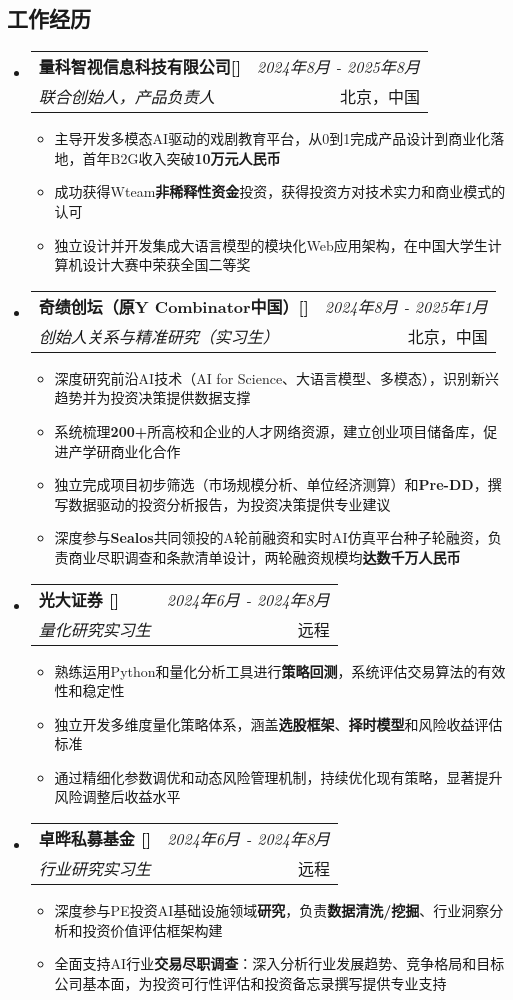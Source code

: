 \documentclass[a4paper,11pt]{article}
\makeatletter
\newcommand{\resumeSubheading}[4]{
\vspace{0.5mm}\item
    \begin{tabular*}{0.98\textwidth}[t]{l@{\extracolsep{\fill}}r}
        \textbf{#1} & \textit{\footnotesize{#4}} \\
        \textit{\footnotesize{#3}} &  \footnotesize{#2}\\
    \end{tabular*}
    \vspace{-2.4mm}
}
\newcommand{\resumeSubHeadingListStart}{\begin{itemize}[leftmargin=*,labelsep=1mm]}
\newcommand{\resumeItemListStart}{\begin{itemize}[leftmargin=*,labelsep=1mm,itemsep=0.5mm]}
\newcommand{\resumeSubHeadingListEnd}{\end{itemize}\vspace{2mm}}
\newcommand{\resumeItemListEnd}{\end{itemize}\vspace{-2mm}}
\makeatother
\begin{document}
\begin{CJK*}{UTF8}{gbsn}
\section{\textbf{工作经历}}
\vspace{-0.4mm}
  \resumeSubHeadingListStart
  \resumeSubheading
      {{量科智视信息科技有限公司[\href{https://quavictech.com/}{\faIcon{globe}}]}}{北京，中国}
      {联合创始人，产品负责人}{2024年8月 - 2025年8月}
      \resumeItemListStart
        \item 主导开发多模态AI驱动的戏剧教育平台，从0到1完成产品设计到商业化落地，首年B2G收入突破\textbf{10万元人民币}
        \item 成功获得Wteam\textbf{非稀释性资金}投资，获得投资方对技术实力和商业模式的认可
        \item 独立设计并开发集成大语言模型的模块化Web应用架构，在中国大学生计算机设计大赛中荣获全国二等奖
      \resumeItemListEnd 
  \resumeSubheading
    {奇绩创坛（原Y Combinator中国）[\href{https://www.miracleplus.com/}{\faIcon{globe}}]}{北京，中国}
    {创始人关系与精准研究（实习生）}{2024年8月 - 2025年1月}
    \resumeItemListStart
      \item 深度研究前沿AI技术（AI for Science、大语言模型、多模态），识别新兴趋势并为投资决策提供数据支撑
      \item 系统梳理\textbf{200+}所高校和企业的人才网络资源，建立创业项目储备库，促进产学研商业化合作
      \item 独立完成项目初步筛选（市场规模分析、单位经济测算）和\textbf{Pre-DD}，撰写数据驱动的投资分析报告，为投资决策提供专业建议
      \item 深度参与\textbf{Sealos}共同领投的A轮前融资和实时AI仿真平台种子轮融资，负责商业尽职调查和条款清单设计，两轮融资规模均\textbf{达数千万人民币}
    \resumeItemListEnd
 \resumeSubheading
    {光大证券 [\href{http://www.ebscn.com/}{\faIcon{globe}}]}{远程}
    {量化研究实习生}{2024年6月 - 2024年8月}
    \resumeItemListStart
      \item 熟练运用Python和量化分析工具进行\textbf{策略回测}，系统评估交易算法的有效性和稳定性
      \item 独立开发多维度量化策略体系，涵盖\textbf{选股框架}、\textbf{择时模型}和风险收益评估标准
      \item 通过精细化参数调优和动态风险管理机制，持续优化现有策略，显著提升风险调整后收益水平
    \resumeItemListEnd
  \resumeSubheading
    {卓晔私募基金 [\href{http://www.zhuoyetz.com/}{\faIcon{globe}}]}{远程}
    {行业研究实习生}{2024年6月 - 2024年8月}
    \resumeItemListStart
      \item 深度参与PE投资AI基础设施领域\textbf{研究}，负责\textbf{数据清洗/挖掘}、行业洞察分析和投资价值评估框架构建
      \item 全面支持AI行业\textbf{交易尽职调查}：深入分析行业发展趋势、竞争格局和目标公司基本面，为投资可行性评估和投资备忘录撰写提供专业支持
    \resumeItemListEnd
  \resumeSubHeadingListEnd
  

\end{CJK*}
\end{document}
